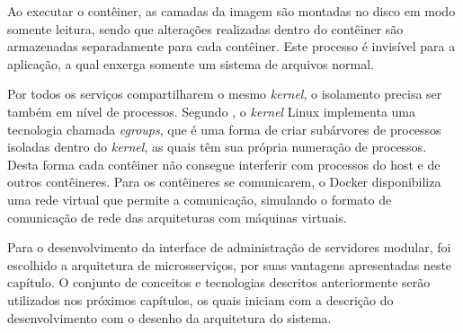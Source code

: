Ao executar o contêiner, as camadas da imagem são montadas no disco em modo
somente leitura, sendo que alterações realizadas dentro do contêiner são
armazenadas separadamente para cada contêiner. Este processo é invisível para
a aplicação, a qual enxerga somente um sistema de arquivos normal.

Por todos os serviços compartilharem o mesmo \emph{kernel}, o isolamento
precisa ser também em nível de processos. Segundo ,
o \emph{kernel} Linux implementa uma tecnologia chamada \emph{cgroups},
que é uma forma de criar subárvores de processos isoladas dentro
do \emph{kernel}, as quais têm sua própria numeração de processos. Desta
forma cada contêiner não consegue interferir com processos do host e de
outros contêineres. Para os contêineres se comunicarem, o Docker
disponibiliza uma rede virtual que permite a comunicação, simulando o
formato de comunicação de rede das arquiteturas com máquinas virtuais.

Para o desenvolvimento da interface de administração de servidores modular,
foi escolhido a arquitetura de microsserviços, por suas vantagens apresentadas
neste capítulo. O conjunto de conceitos e tecnologias descritos anteriormente
serão utilizados nos próximos capítulos, os quais iniciam com a descrição do
desenvolvimento com o desenho da arquitetura do sistema.
